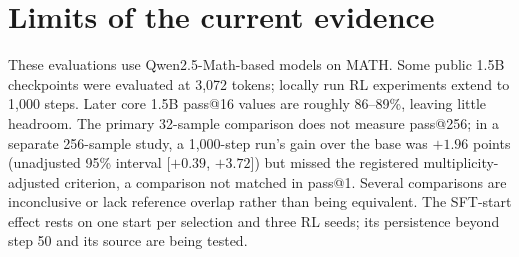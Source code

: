 \documentclass[11pt]{article}
\begin{document}
\section{Limits of the current evidence}
These evaluations use Qwen2.5-Math-based models on MATH. Some public 1.5B checkpoints were evaluated at 3,072 tokens;
locally run RL experiments extend to 1,000 steps. Later core 1.5B pass@16 values are roughly 86--89\%, leaving little
headroom. The primary 32-sample comparison does not measure pass@256; in a separate 256-sample study, a 1,000-step
run's gain over the base was $+1.96$ points (unadjusted 95\% interval [$+0.39$, $+3.72$]) but missed the registered
multiplicity-adjusted criterion, a comparison not matched in pass@1. Several comparisons are inconclusive or lack
reference overlap rather than being equivalent. The SFT-start effect rests on one start per selection and three RL
seeds; its persistence beyond step 50 and its source are being tested.
\end{document}
